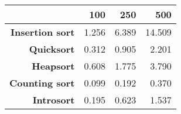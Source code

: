 \begin{tabular}{rrrr}
\hline
                         &   \textbf{100} &   \textbf{250} &   \textbf{500} \\
\hline
 \textbf{Insertion sort} &          1.256 &          6.389 &         14.509 \\
      \textbf{Quicksort} &          0.312 &          0.905 &          2.201 \\
       \textbf{Heapsort} &          0.608 &          1.775 &          3.790 \\
  \textbf{Counting sort} &          0.099 &          0.192 &          0.370 \\
      \textbf{Introsort} &          0.195 &          0.623 &          1.537 \\
\hline
\end{tabular}